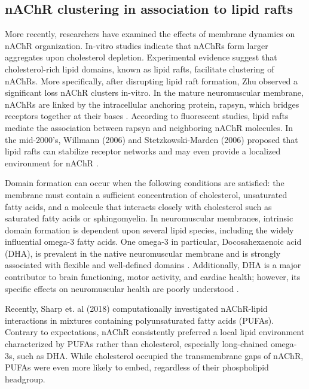 \subsection{nAChR clustering in association to lipid rafts}
More recently, researchers have examined the effects of membrane dynamics on nAChR organization\cite{Baenziger2015,Bruses2001,Marchand2002a,Oshikawa2003, Pato2008,Zhu2006a,Baenziger2017,Barrantes2007,Barrantes2000,Barrantes2010, Bermudez2010,Perillo2016,Wenz2005,Borroni2016,Unwin2017}. In-vitro studies\cite{Barrantes2007, Barrantes2010} indicate that nAChRs form larger aggregates upon cholesterol depletion. Experimental evidence suggest that cholesterol-rich lipid domains, known as lipid rafts, facilitate clustering of nAChRs\cite{Campagna2006, Marchand2002a, Pato2008}. 
More specifically, after disrupting lipid raft formation, Zhu observed a significant loss nAChR clusters in-vitro\cite{Zhu2006a}. In the mature neuromuscular membrane, nAChRs are linked by the intracellular anchoring protein, rapsyn, which bridges receptors together at their bases \cite{Zuber2013a}. According to fluorescent studies\cite{Marchand2002a}, lipid rafts mediate the association between rapsyn and neighboring nAChR molecules. In the mid-2000's, Willmann (2006) and Stetzkowski-Marden (2006) proposed that lipid rafts can stabilize receptor networks and may even provide a localized environment for nAChR \cite{Willmann2006,Stetzkowski-Marden2006}. 




Domain formation can occur when the following conditions are satisfied: the membrane must contain a sufficient concentration of cholesterol, unsaturated fatty acids, and a molecule that interacts closely with cholesterol such as saturated fatty acids or sphingomyelin\cite{Feller_Acyl_2008,Yeagle2016115}. In neuromuscular membranes, intrinsic domain formation is dependent upon several lipid species, including the widely influential omega-3 fatty acids. One omega-3 in particular, Docosahexaenoic acid (DHA), is prevalent in the native neuromuscular membrane and is strongly associated with flexible and well-defined domains \cite{Turk2013,shaikh_dumaual_castillo_locascio_siddiqui_stillwell_wassall_2004}. Additionally, DHA is a major contributor to brain functioning, motor activity, and cardiac health; however, its specific effects on neuromuscular health are poorly understood \cite{12439486320170901, S000930840800032720080101, Georgieva2015}. 


Recently, Sharp et. al (2018)\cite{Sharp2018} computationally investigated nAChR-lipid interactions in mixtures containing polyunsaturated fatty acids (PUFAs). Contrary to expectations, nAChR consistently preferred a local lipid environment characterized by PUFAs rather than cholesterol, especially long-chained omega-3s, such as DHA. While cholesterol occupied the transmembrane gaps of nAChR, PUFAs were even more likely to embed, regardless of their phospholipid headgroup. 


